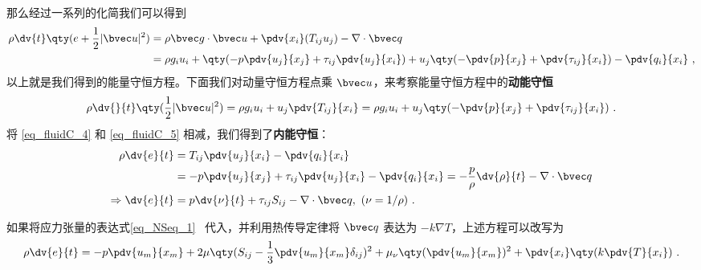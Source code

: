 那么经过一系列的化简我们可以得到
\begin{equation}\label{eq_fluidC_4}
\begin{aligned}
\rho \dv{t} \qty(e+\frac{1}{2}|\bvec u|^2)&=\rho \bvec g\cdot \bvec u+\pdv{x_i} (T_{ij}u_j)-\nabla\cdot \bvec q\\
&=\rho g_iu_i+\qty(-p\pdv{u_j}{x_j}+\tau_{ij}\pdv{u_j}{x_i})+u_j\qty(-\pdv{p}{x_j}+\pdv{\tau_{ij}}{x_i})-\pdv{q_i}{x_i}~,
\end{aligned}
\end{equation}
以上就是我们得到的能量守恒方程。下面我们对动量守恒方程点乘 $\bvec u$，来考察能量守恒方程中的\textbf{动能守恒}
\begin{equation}\label{eq_fluidC_5}
\rho \dv{}{t}\qty(\frac{1}{2}|\bvec u|^2)=\rho g_iu_i+u_j\pdv{T_{ij}}{x_i}=\rho g_iu_i+u_j\qty(-\pdv{p}{x_j}+\pdv{\tau_{ij}}{x_i})~.
\end{equation}
将 \autoref{eq_fluidC_4} 和 \autoref{eq_fluidC_5} 相减，我们得到了\textbf{内能守恒}：
\begin{equation}
\begin{aligned}
\rho \dv{e}{t}&=T_{ij}\pdv{u_j}{x_i}-\pdv{q_i}{x_i}
\\&=-p\pdv{u_j}{x_j}+\tau_{ij}\pdv{u_j}{x_i}-\pdv{q_i}{x_i}=-\frac{p}{\rho}\dv{\rho}{t}-\nabla\cdot \bvec q\\
\Rightarrow \dv{e}{t}&=p\dv{\nu}{t}+\tau_{ij}S_{ij}-\nabla\cdot \bvec q,\ (\nu=1/\rho)~.\\
\end{aligned}
\end{equation}

如果将应力张量的表达式\autoref{eq_NSeq_1}~ 代入，并利用热传导定律将 $\bvec q$ 表达为 $-k\nabla T$，上述方程可以改写为
\begin{equation}\label{eq_fluidC_7}
\rho \dv{e}{t}=-p\pdv{u_m}{x_m}+2\mu\qty(S_{ij}-\frac{1}{3}\pdv{u_m}{x_m}\delta_{ij})^2+\mu_\nu\qty(\pdv{u_m}{x_m})^2+\pdv{x_i}\qty(k\pdv{T}{x_i})~.
\end{equation}
